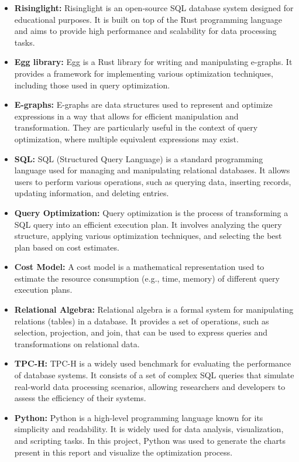 \documentclass[a4paper,12pt]{scrreprt}
\begin{document}
\begin{itemize}
    \item \textbf{Risinglight:} Risinglight is an open-source SQL database system designed for educational purposes. It is built on top of the Rust programming language and aims to provide high performance and scalability for data processing tasks.
    \item \textbf{Egg library:} Egg is a Rust library for writing and manipulating e-graphs. It provides a framework for implementing various optimization techniques, including those used in query optimization.
    \item \textbf{E-graphs:} E-graphs are data structures used to represent and optimize expressions in a way that allows for efficient manipulation and transformation. They are particularly useful in the context of query optimization, where multiple equivalent expressions may exist.
    \item \textbf{SQL:} SQL (Structured Query Language) is a standard programming language used for managing and manipulating relational databases. It allows users to perform various operations, such as querying data, inserting records, updating information, and deleting entries.
    \item \textbf{Query Optimization:} Query optimization is the process of transforming a SQL query into an efficient execution plan. It involves analyzing the query structure, applying various optimization techniques, and selecting the best plan based on cost estimates.
    \item \textbf{Cost Model:} A cost model is a mathematical representation used to estimate the resource consumption (e.g., time, memory) of different query execution plans.
    \item \textbf{Relational Algebra:} Relational algebra is a formal system for manipulating relations (tables) in a database. It provides a set of operations, such as selection, projection, and join, that can be used to express queries and transformations on relational data.
    \item \textbf{TPC-H:} TPC-H is a widely used benchmark for evaluating the performance of database systems. It consists of a set of complex SQL queries that simulate real-world data processing scenarios, allowing researchers and developers to assess the efficiency of their systems.
    \item \textbf{Python:} Python is a high-level programming language known for its simplicity and readability. It is widely used for data analysis, visualization, and scripting tasks. In this project, Python was used to generate the charts present in this report and visualize the optimization process.

\end{itemize}
\end{document}

